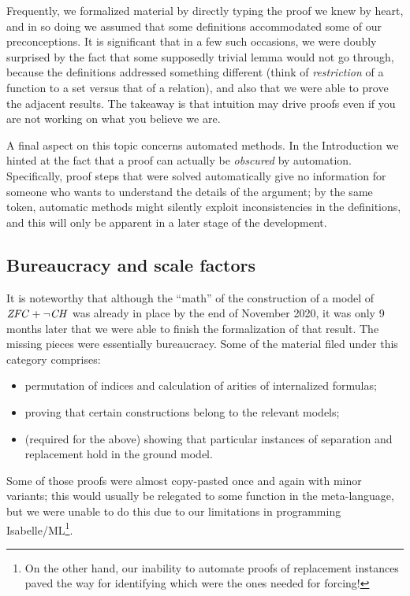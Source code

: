 Frequently, we formalized material by directly typing the proof we
knew by heart, and in so doing we assumed that some definitions
accommodated some of our preconceptions.
It is significant that in a few such occasions, we were doubly
surprised by the fact that some supposedly trivial lemma would not go
through, because the definitions addressed something different (think
of \emph{restriction} of a function to a set versus that of a
relation), and also that we were able to prove the adjacent
results. The takeaway is that intuition may drive proofs
even if you are not working on what you believe we are.

A final aspect on this topic concerns automated methods. In the
Introduction we hinted at the fact that a proof can actually be
\emph{obscured} by automation. Specifically, proof steps that were solved automatically give no
information for someone who wants to understand the details of the
argument; by the same token, automatic methods might silently exploit
inconsistencies in the definitions, and this will only be apparent in
a later stage of the development.


\subsection{Bureaucracy and scale factors}
\label{sec:bureaucracy-scale-factors}

It is noteworthy that although the “math” of the construction of a
model of $\mathit{ZFC}+\neg\mathit{CH}$ was already in place by the end of November
2020, it was only 9 months later that we were able to finish the
formalization of that result. The missing pieces were essentially
bureaucracy. Some of the material filed under this category comprises:
\begin{itemize}
\item permutation of indices and calculation of arities of
  internalized formulas;
\item proving that certain constructions belong to the relevant
  models;
\item (required for the above) showing that particular instances of
  separation and replacement hold in the ground model.
\end{itemize}

Some of those proofs were almost copy-pasted once and again with minor
variants; this would usually be relegated to some function in the
meta-language, but we were unable to do this due to our limitations in
programming Isabelle/ML\footnote{%
  On the other hand, our inability to automate proofs of replacement
  instances paved the way for identifying which were the ones needed for
  forcing!}.

